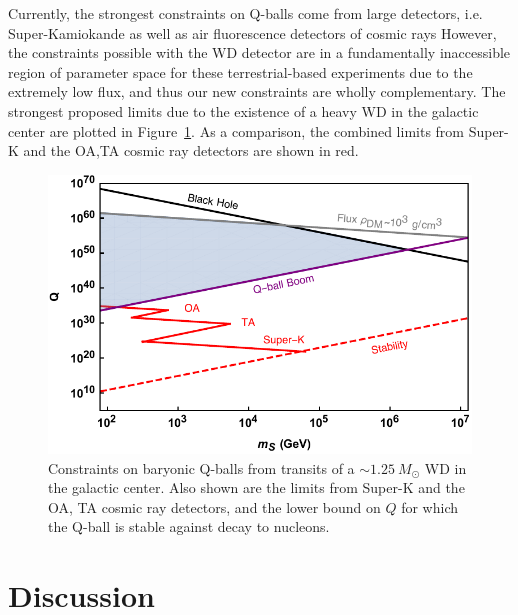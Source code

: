 \documentclass[twocolumn,showpacs,preprintnumbers,amsmath,amssymb,prd]{revtex4}
\begin{document}
Currently, the strongest constraints on Q-balls come from large detectors, i.e. Super-Kamiokande as well as air fluorescence detectors of cosmic rays
However, the constraints possible with the WD detector are in a fundamentally inaccessible region of parameter space for these terrestrial-based experiments due to the extremely low flux, and thus our new constraints are wholly complementary.
The strongest proposed limits due to the existence of a heavy WD in the galactic center are plotted in Figure~\ref{fig:Qballconstraint}. As a comparison, the combined limits from Super-K and the OA,TA cosmic ray detectors are shown in red. 
\begin{figure}
\includegraphics[scale=.55]{Qballconstraint.pdf}
\caption{Constraints on baryonic Q-balls from transits of a $\sim 1.25 ~M_{\odot}$ WD in the galactic center. Also shown are the limits from Super-K and the OA, TA cosmic ray detectors, and the lower bound on $Q$ for which the Q-ball is stable against decay to nucleons.}
\label{fig:Qballconstraint}
\end{figure}

\section{Discussion}
\label{sec:Discussion}
\end{document}

